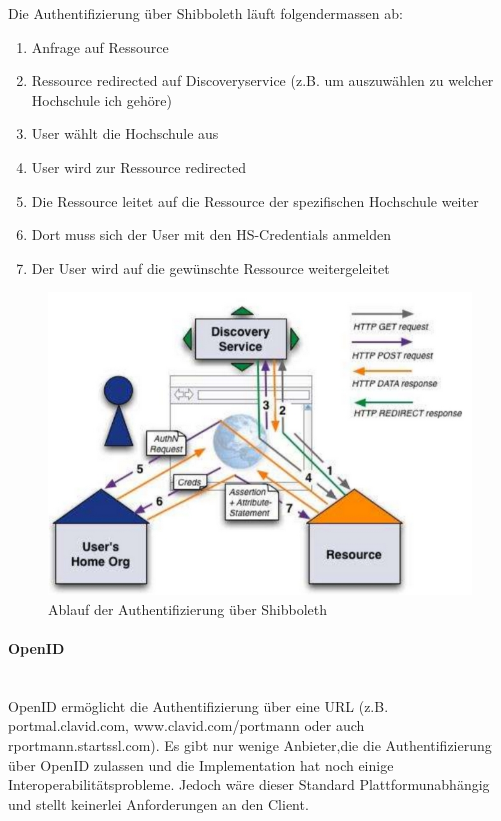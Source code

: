 \documentclass[a4paper, 11pt]{article}
\begin{document}
\vspace{10px}

\noindent Die Authentifizierung über Shibboleth läuft folgendermassen ab:

\begin{enumerate}
	\item Anfrage auf Ressource 
	\item Ressource redirected auf Discoveryservice (z.B. um auszuwählen zu welcher Hochschule ich gehöre) 
	\item User wählt die Hochschule aus 
	\item User wird zur Ressource redirected 
	\item Die Ressource leitet auf die Ressource der spezifischen Hochschule weiter 
	\item Dort muss sich der User mit den HS-Credentials anmelden 
	\item Der User wird auf die gewünschte Ressource weitergeleitet 
\end{enumerate}

\begin{figure}[htb]
	\centering
	\includegraphics[keepaspectratio=true,height=15\baselineskip]{shibboleth.jpg}
	\caption{Ablauf der Authentifizierung über Shibboleth}
	\label{fig:rel}
\end{figure}

\paragraph{OpenID}\mbox{}\\
OpenID ermöglicht die Authentifizierung über eine URL (z.B. portmal.clavid.com, www.clavid.com/portmann oder auch rportmann.startssl.com). Es gibt nur wenige Anbieter,die die Authentifizierung über OpenID zulassen und die Implementation hat noch einige Interoperabilitätsprobleme. Jedoch wäre dieser Standard Plattformunabhängig und stellt keinerlei Anforderungen an den Client.
\end{document}

